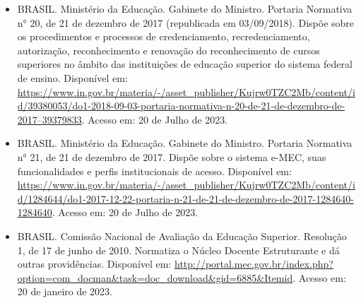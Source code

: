\begin{itemize}
  \item BRASIL. Ministério da Educação. Gabinete do Ministro. Portaria
    Normativa n° 20, de 21 de dezembro de 2017 (republicada em
    03/09/2018). Dispõe sobre os procedimentos e processos de
    credenciamento, recredenciamento, autorização, reconhecimento e
    renovação do reconhecimento de cursos superiores no âmbito das
    instituições de educação superior do sistema federal de
    ensino. Disponível em:\\
    \href{https://www.in.gov.br/materia/-/asset_publisher/Kujrw0TZC2Mb/content/id/39380053/do1-2018-09-03-portaria-normativa-n-20-de-21-de-dezembro-de-2017--39379833}{https://www.in.gov.br/materia/-/asset\_publisher/Kujrw0TZC2Mb/content/id/39380053/do1-2018-09-03-portaria-normativa-n-20-de-21-de-dezembro-de-2017--39379833}.
    Acesso em: 20 de Julho de 2023.
    
    \item BRASIL. Ministério da Educação. Gabinete do Ministro. Portaria
    Normativa n° 21, de 21 de dezembro de 2017. Dispõe sobre o sistema
    e-MEC, suas funcionalidades e perfis institucionais de
    acesso. Disponível em:\\
    \href{https://www.in.gov.br/materia/-/asset_publisher/Kujrw0TZC2Mb/content/id/1284644/do1-2017-12-22-portaria-n-21-de-21-de-dezembro-de-2017-1284640-1284640}{https://www.in.gov.br/materia/-/asset\_publisher/Kujrw0TZC2Mb/content/id/1284644/do1-2017-12-22-portaria-n-21-de-21-de-dezembro-de-2017-1284640-1284640}.
    Acesso em: 20 de Julho de 2023.
    
    \item BRASIL. Comissão Nacional de Avaliação da Educação Superior.
    Resolução 1, de 17 de junho de 2010. Normatiza o Núcleo Docente
    Estruturante e dá outras providências. 
    Disponível em: \url{http://portal.mec.gov.br/index.php?option=com_docman&task=doc_download&gid=6885&Itemid}.
    Acesso em: 20 de janeiro de 2023.
    

\end{itemize}
